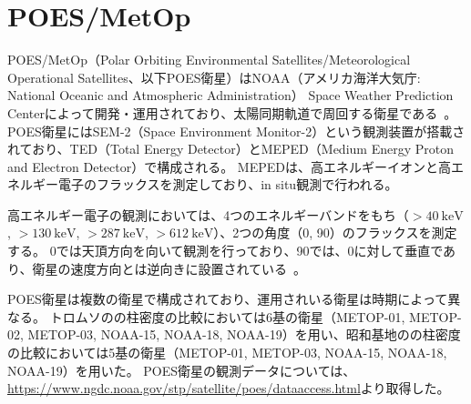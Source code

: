 \chapter{POES/MetOp}
\label{app:poes}
POES/MetOp（Polar Orbiting Environmental Satellites/Meteorological Operational Satellites、以下POES衛星）はNOAA（アメリカ海洋大気庁: National Oceanic and Atmospheric Administration） Space Weather Prediction Centerによって開発・運用されており、太陽同期軌道で周回する衛星である~\cite{poes2013noaa}。
POES衛星にはSEM-2（Space Environment Monitor-2）という観測装置が搭載されており、TED（Total Energy Detector）とMEPED（Medium Energy Proton and Electron Detector）で構成される。
MEPEDは、高エネルギーイオンと高エネルギー電子のフラックスを測定しており、in situ観測で行われる。\par

高エネルギー電子の観測においては、4つのエネルギーバンドをもち（$>40\ \mathrm{keV}$, $>130\ \mathrm{keV}$, $>287\ \mathrm{keV}$, $>612\ \mathrm{keV}$）、2つの角度（0\textdegree, 90\textdegree）のフラックスを測定する。
0\textdegree では天頂方向を向いて観測を行っており、90\textdegree では、0\textdegree に対して垂直であり、衛星の速度方向とは逆向きに設置されている~\cite{meped2013noaa}。\par

POES衛星は複数の衛星で構成されており、運用されいる衛星は時期によって異なる。
トロムソのの柱密度の比較においては6基の衛星（METOP-01, METOP-02, METOP-03, NOAA-15, NOAA-18, NOAA-19）を用い、昭和基地のの柱密度の比較においては5基の衛星（METOP-01, METOP-03, NOAA-15, NOAA-18, NOAA-19）を用いた。
POES衛星の観測データについては、\url{https://www.ngdc.noaa.gov/stp/satellite/poes/dataaccess.html}より取得した。\par

